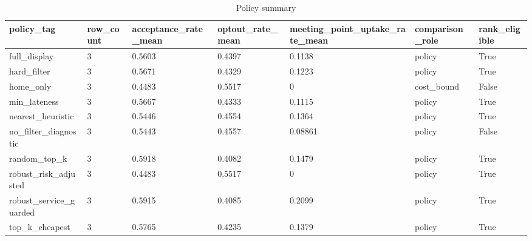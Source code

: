\begin{table}[ht]
\centering
\begin{tabular}{lllllll}
 \hline
policy\_tag & row\_count & acceptance\_rate\_mean & optout\_rate\_mean & meeting\_point\_uptake\_rate\_mean & comparison\_role & rank\_eligible \\
 \hline
full\_display & 3 & 0.5603 & 0.4397 & 0.1138 & policy & True \\
hard\_filter & 3 & 0.5671 & 0.4329 & 0.1223 & policy & True \\
home\_only & 3 & 0.4483 & 0.5517 & 0 & cost\_bound & False \\
min\_lateness & 3 & 0.5667 & 0.4333 & 0.1115 & policy & True \\
nearest\_heuristic & 3 & 0.5446 & 0.4554 & 0.1364 & policy & True \\
no\_filter\_diagnostic & 3 & 0.5443 & 0.4557 & 0.08861 & policy & False \\
random\_top\_k & 3 & 0.5918 & 0.4082 & 0.1479 & policy & True \\
robust\_risk\_adjusted & 3 & 0.4483 & 0.5517 & 0 & policy & True \\
robust\_service\_guarded & 3 & 0.5915 & 0.4085 & 0.2099 & policy & True \\
top\_k\_cheapest & 3 & 0.5765 & 0.4235 & 0.1379 & policy & True \\
 \hline
\end{tabular}
\caption{Policy summary}
\end{table}
